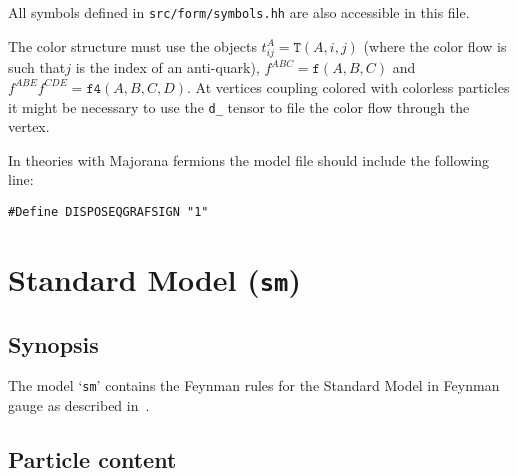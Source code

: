 All symbols defined in \texttt{src/form/symbols.hh} are also accessible in this \form{} file.



The color structure must use the objects $t_{ij}^A=\mathtt{T}(A, i, j)$ (where the color flow is such
that$j$ is the index of an anti-quark), $f^{ABC}=\mathtt{f}(A, B, C)$ and
$f^{ABE}f^{CDE}=\mathtt{f4}(A,B,C,D)$. At vertices coupling colored with colorless particles
it might be necessary to use the \texttt{d\_} tensor to file the color flow through the vertex.


In theories with Majorana fermions the model file should include the following
line:
\begin{lstlisting}[style=form]
#Define DISPOSEQGRAFSIGN "1"
\end{lstlisting}

\section{Standard Model (\texttt{sm})}
\label{sec:model-files:sm}
\subsection{Synopsis}
The model `\texttt{sm}' contains the Feynman rules for the
Standard Model in Feynman gauge as described
in~\cite[Appendix~A]{Boehm:2001}.
\renewcommand{\arraystretch}{1.1}
\subsection{Particle content}
